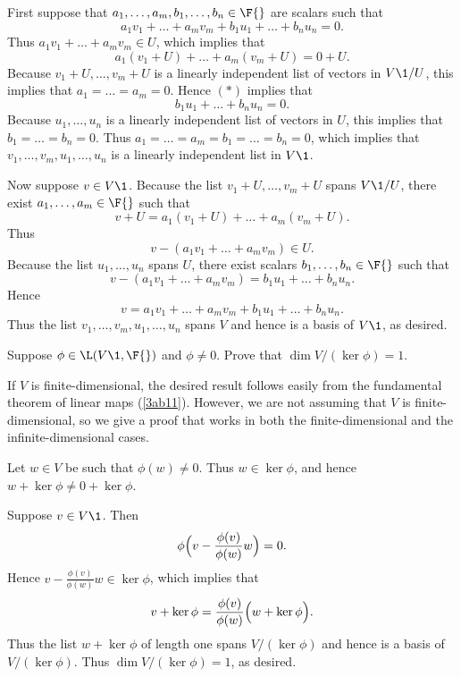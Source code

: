 \begin{Solution}
First suppose that $a_1, \dots, a_m, b_1, \dots, b_n \in \F{}$ are scalars such that
\[ \tag{$(*)$}
a_1 v_1 + \dots + a_m v_m + b_1 u_1 + \dots + b_n u_n = 0.
\]
Thus $a_1 v_1 + \dots + a_m v_m \in U$, which implies that
\[
a_1(v_1 + U) + \dots + a_m (v_m + U) = 0 + U.
\]
Because $v_1 + U, \dots, v_m + U$ is a linearly independent list of vectors in $V\1/U$, this implies that $a_1 = \dots = a_m = 0$. Hence $(*)$ implies that
\[
b_1 u_1 + \dots + b_n u_n = 0.
\]
Because $u_1, \dots, u_n$ is a linearly independent list of vectors in $U$, this implies that
$b_1 = \dots = b_n = 0$. Thus $a_1 = \dots = a_m = b_1 = \dots = b_n = 0$, which implies that
$v_1, \dots, v_m, u_1, \dots, u_n$ is a linearly independent list in $V\1$.

Now suppose $v \in V\1$. Because the list $v_1 + U, \dots, v_m + U$ spans $V\1/U$, there exist
$a_1, \dots, a_m \in \F{}$ such that
\[
v + U = a_1(v_1 + U) + \dots + a_m(v_m + U).
\]
Thus
\[
v - (a_1 v_1 + \dots + a_m v_m) \in U.
\]
Because the list $u_1, \dots, u_n$ spans $U$, there exist scalars $b_1, \dots, b_n \in \F{}$ such that
\[
v - (a_1 v_1 + \dots + a_m v_m) = b_1 u_1 + \dots + b_n u_n.
\]
Hence
\[
v = a_1 v_1 + \dots + a_m v_m + b_1 u_1 + \dots + b_n u_n.
\]
Thus the list $v_1, \dots, v_m, u_1, \dots, u_n$ spans $V$ and hence is a basis of $V\1$, as desired.
\end{Solution}

\exercise
Suppose $\phi \in \L(V\1, \F{})$ and $\phi \ne 0$. Prove that $\dim V \!/\! (\ker \phi) = 1$.

\begin{Solution}
If $V$ is finite-dimensional, the desired result follows easily from the fundamental theorem of linear maps (\ref{3ab11}). However, we are not assuming that $V$ is finite-dimensional, so we give a proof that works in both the finite-dimensional and the infinite-dimensional cases.

Let $w \in V$ be such that $\phi(w) \ne 0$. Thus $w \in \ker \phi$, and hence $w + \ker \phi \ne 0 + \ker \phi$.

Suppose $v \in V\1$. Then
\[
\phi\Bigl( v - \frac{\phi(v)}{\phi(w)} w \Bigr) = 0.
\]
Hence $v - \frac{\phi(v)}{\phi(w)} w  \in \ker \phi$, which implies that
\[
v + \ker \phi = \frac{\phi(v)}{\phi(w)} \Bigl( w + \ker \phi \Bigr).
\]
Thus the list $w + \ker \phi$ of length one spans $V \!/\! (\ker \phi)$ and hence is a basis of $V \!/\! (\ker \phi)$. Thus $\dim V \!/\! (\ker \phi) = 1$, as desired.
\end{Solution}

